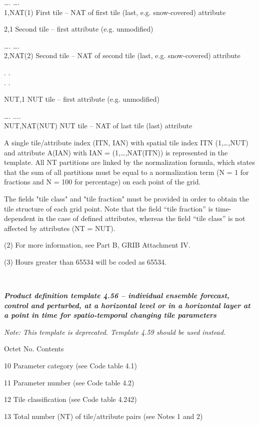 \ldots. \ldots.\\
1,NAT(1) First tile -- NAT of first tile (last, e.g. snow-covered) attribute

2,1 Second tile -- first attribute (e.g. unmodified)

\ldots. \ldots.\\
2,NAT(2) Second tile -- NAT of second tile (last, e.g. snow-covered) attribute

. .\\
. .

NUT,1 NUT tile -- first attribute (e.g. unmodified)

\ldots. ....\\
NUT,NAT(NUT) NUT tile -- NAT of last tile (last) attribute

A single tile/attribute index (ITN, IAN) with spatial tile index ITN (1,\ldots,NUT) and attribute A(IAN) with IAN = (1,\ldots,NAT(ITN)) is represented in the template. All NT partitions are linked by the normalization formula, which states that the sum of all partitions must be equal to a normalization term (N = 1 for fractions and N = 100 for percentage) on each point of the grid.

The fields "tile class" and "tile fraction" must be provided in order to obtain the tile structure of each grid point. Note that the field ``tile fraction'' is time-dependent in the case of defined attributes, whereas the field ``tile class'' is not affected by attributes (NT = NUT).

(2) For more information, see Part B, GRIB Attachment IV.

(3) Hours greater than 65534 will be coded as 65534.

\emph{\textbf{\\
}}

\emph{\textbf{Product definition template 4.56 -- individual ensemble forecast, control and perturbed, at a horizontal level or in a horizontal layer at a point in time for spatio-temporal changing tile parameters}}

\emph{Note: This template is deprecated. Template 4.59 should be used instead.}

Octet No. Contents

10 Parameter category (see Code table 4.1)

11 Parameter number (see Code table 4.2)

12 Tile classification (see Code table 4.242)

13 Total number (NT) of tile/attribute pairs (see Notes 1 and 2)

